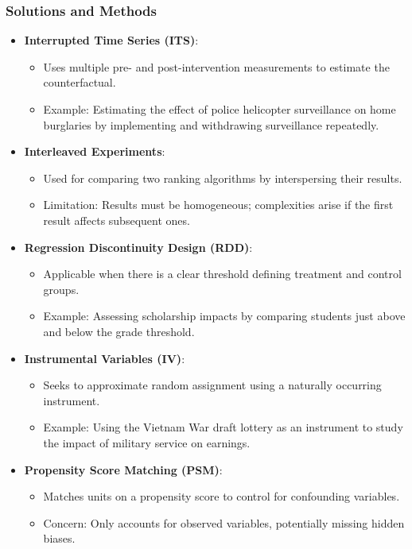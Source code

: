\documentclass{article}
\begin{document}
\subsubsection*{Solutions and Methods}
\begin{itemize}
    \item \textbf{Interrupted Time Series (ITS)}: 
    \begin{itemize}
        \item Uses multiple pre- and post-intervention measurements to estimate the counterfactual.
        \item Example: Estimating the effect of police helicopter surveillance on home burglaries by implementing and withdrawing surveillance repeatedly.
    \end{itemize}

    \item \textbf{Interleaved Experiments}:
    \begin{itemize}
        \item Used for comparing two ranking algorithms by interspersing their results.
        \item Limitation: Results must be homogeneous; complexities arise if the first result affects subsequent ones.
    \end{itemize}

    \item \textbf{Regression Discontinuity Design (RDD)}:
    \begin{itemize}
        \item Applicable when there is a clear threshold defining treatment and control groups.
        \item Example: Assessing scholarship impacts by comparing students just above and below the grade threshold.
    \end{itemize}

    \item \textbf{Instrumental Variables (IV)}:
    \begin{itemize}
        \item Seeks to approximate random assignment using a naturally occurring instrument.
        \item Example: Using the Vietnam War draft lottery as an instrument to study the impact of military service on earnings.
    \end{itemize}

    \item \textbf{Propensity Score Matching (PSM)}:
    \begin{itemize}
        \item Matches units on a propensity score to control for confounding variables.
        \item Concern: Only accounts for observed variables, potentially missing hidden biases.
    \end{itemize}


\end{itemize}
\end{document}
